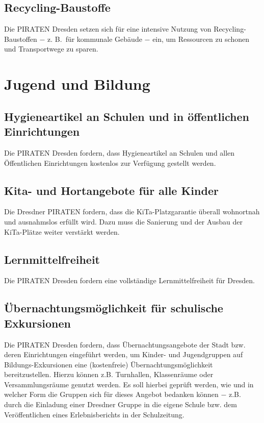 \documentclass[a4paper, 11pt]{article}
\begin{document}
\subsection{Recycling-Baustoffe}
Die PIRATEN Dresden setzen sich für eine intensive Nutzung von Recycling-Baustoffen $-$ z. B.~für kommunale Gebäude $-$ ein, um Ressourcen zu schonen und Transportwege zu sparen.


\section{Jugend und Bildung}

\subsection{Hygieneartikel an Schulen und in öffentlichen Einrichtungen}
Die PIRATEN Dresden fordern, dass Hygieneartikel an Schulen und allen Öffentlichen Einrichtungen kostenlos zur Verfügung gestellt werden.


\subsection{Kita- und Hortangebote für alle Kinder}
Die Dresdner PIRATEN fordern, dass die KiTa-Platzgarantie überall wohnortnah und ausnahmslos erfüllt wird. Dazu muss die Sanierung und der Ausbau der KiTa-Plätze weiter verstärkt werden.


\subsection{Lernmittelfreiheit}
Die PIRATEN Dresden fordern eine vollständige Lernmittelfreiheit für Dresden.


\subsection{Übernachtungsmöglichkeit für schulische Exkursionen}
Die PIRATEN Dresden fordern, dass Übernachtungsangebote der Stadt bzw. deren Einrichtungen eingeführt werden, um Kinder- und Jugendgruppen auf Bildungs-Exkursionen eine (kostenfreie) Übernachtungsmöglichkeit bereitzustellen. Hierzu können z.B. Turnhallen, Klassenräume oder Versammlungsräume genutzt werden. Es soll hierbei geprüft werden, wie und in welcher Form die Gruppen sich für dieses Angebot bedanken können $-$ z.B.~ durch die Einladung einer Dresdner Gruppe in die eigene Schule bzw. dem Veröffentlichen eines Erlebnisberichts in der Schulzeitung.
\end{document}
